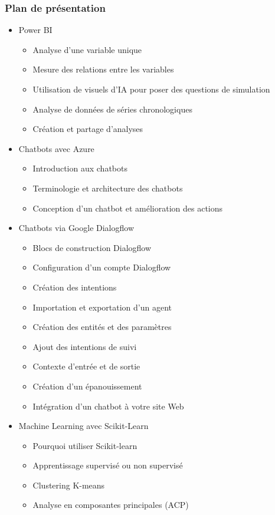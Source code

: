 \documentclass{beamer}
\begin{document}
\begin{frame}
	\frametitle{Plan de présentation}
	\begin{itemize}
		\item Power BI

			\begin{itemize}
			\item Analyse d'une variable unique
			\item Mesure des relations entre les variables
			\item Utilisation de visuels d'IA pour poser des questions de simulation
			\item Analyse de données de séries chronologiques
			\item Création et partage d'analyses
		\end{itemize}

		\item Chatbots avec Azure
			\begin{itemize}
			\item Introduction aux chatbots
			\item Terminologie et architecture des chatbots
			\item Conception d'un chatbot et amélioration des actions
		\end{itemize}
		\item Chatbots via Google Dialogflow
			\begin{itemize}
			\item Blocs de construction Dialogflow
			\item Configuration d'un compte Dialogflow
			\item Création des intentions
			\item Importation et exportation d'un agent
			\item Création des entités et des paramètres
			\item Ajout des intentions de suivi
			\item Contexte d'entrée et de sortie
			\item Création d'un épanouissement
			\item Intégration d'un chatbot à votre site Web
		\end{itemize}
		\item Machine Learning avec Scikit-Learn
			\begin{itemize}
			\item Pourquoi utiliser Scikit-learn
			\item Apprentissage supervisé ou non supervisé
			\item Clustering K-means
			\item Analyse en composantes principales (ACP)
		\end{itemize}
	\end{itemize}
\end{frame}
\end{document}
